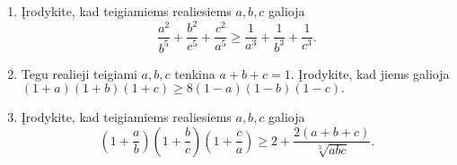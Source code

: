 \begin{enumerate}
  \item Įrodykite, kad teigiamiems realiesiems $a,b,c$ galioja
    $$\frac{a^2}{b^5}+\frac{b^2}{c^5}+\frac{c^2}{a^5}\geq\frac{1}{a^3}+\frac{1}{b^3}+\frac{1}{c^3}.$$
  \item Tegu realieji teigiami $a,b,c$ tenkina $a+b+c=1$. Įrodykite, kad
    jiems galioja $(1+a)(1+b)(1+c)\geq8(1-a)(1-b)(1-c).$
  \item \text{[APMO 1998]} Įrodykite, kad teigiamiems realiesiems $a,b,c$
    galioja
    $$\left(1+\frac{a}{b}\right)\left(1+\frac{b}{c}\right)\left(1+\frac{c}{a}\right)\geq2+\frac{2(a+b+c)}{\sqrt[3]{abc}}.$$

\end{enumerate}
